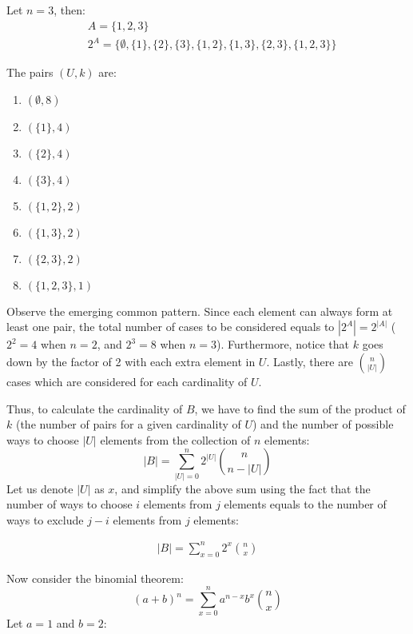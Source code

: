 \documentclass[12pt]{article}
\newenvironment{ps}
{\begin{enumerate}[leftmargin=0em, itemindent=1.5em]}
{\end{enumerate}}
\begin{document}
\begin{ps}
    Let \( n = 3 \), then:
    \begin{align*}
        &A = \{1, 2, 3\} \\
        &2^A = \{\emptyset, \{1\}, \{2\}, \{3\}, \{1, 2\}, \{1,3\}, \{2, 3\}, \{1, 2, 3\} \} 
    \end{align*}

    The pairs \( (U, k) \) are:
    \begin{enumerate}[label=\arabic*.]
        \item \( (\emptyset, 8) \)
        \item \( (\{1\}, 4) \)
        \item \( (\{2\}, 4) \)
        \item \( (\{3\}, 4) \)
        \item \( (\{1,2\}, 2) \)
        \item \( (\{1,3\}, 2) \)
        \item \( (\{2,3\}, 2) \)
        \item \( (\{1,2,3\}, 1) \)
    \end{enumerate}

    Observe the emerging common pattern. Since each element can always form at least one pair, the
    total number of cases to be considered equals to \( |2^A| = 2^{|A|} \) (\( 2^2 = 4 \) when \( n
    = 2 \), and \( 2^3 = 8 \) when \( n = 3 \)). Furthermore, notice that \( k \) goes down by the
    factor of 2 with each extra element in \( U \). Lastly, there are \( \binom{n}{|U|} \) cases
    which are considered for each cardinality of \( U \).

    Thus, to calculate the cardinality of \( B \), we have to find the sum of the
    product of \( k \) (the number of pairs for a given cardinality of \( U \)) and the number of
    possible ways to choose \( |U| \) elements from the collection of \( n \) elements: 
    \[
        |B| = \sum_{|U|=0}^n 2^{|U|}\binom{n}{n - |U|}
    \]
    Let us denote \( |U| \) as \( x \), and simplify the above sum using the fact that the number of
    ways to choose \( i \) elements from \( j \) elements equals to the number of ways to exclude \(
    j - i \) elements from \( j \) elements:
    
    \begin{align}
        \label{sum2x}
        |B| = \sum_{x=0}^n 2^x \binom{n}{x}
    \end{align}
    
    Now consider the binomial theorem:
    \[
        (a+b)^n = \sum_{x=0}^n a^{n-x} b^x \binom{n}{x}
    \]   
    Let \( a = 1 \) and \( b = 2 \):
    

\end{ps}
\end{document}
